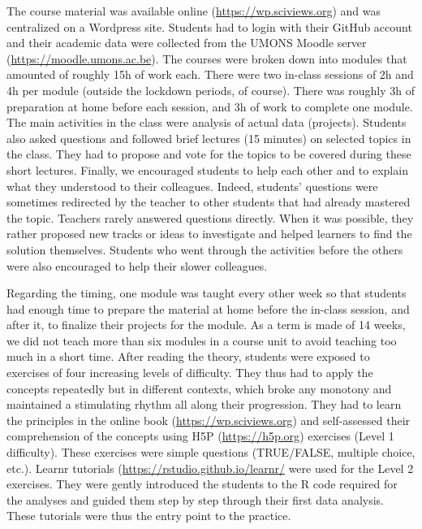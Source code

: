 \documentclass{aims} %
\theoremstyle{definition}
\begin{document}
The course material was available online (\url{https://wp.sciviews.org})
and was centralized on a Wordpress site. Students had to login with
their GitHub account and their academic data were collected from the
UMONS Moodle server (\url{https://moodle.umons.ac.be}). The courses were
broken down into modules that amounted of roughly 15h of work each.
There were two in-class sessions of 2h and 4h per module (outside the
lockdown periods, of course). There was roughly 3h of preparation at
home before each session, and 3h of work to complete one module. The
main activities in the class were analysis of actual data (projects).
Students also asked questions and followed brief lectures (15 minutes)
on selected topics in the class. They had to propose and vote for the
topics to be covered during these short lectures. Finally, we encouraged
students to help each other and to explain what they understood to their
colleagues. Indeed, students' questions were sometimes redirected by the
teacher to other students that had already mastered the topic. Teachers
rarely answered questions directly. When it was possible, they rather
proposed new tracks or ideas to investigate and helped learners to find
the solution themselves. Students who went through the activities before
the others were also encouraged to help their slower colleagues.

Regarding the timing, one module was taught every other week so that
students had enough time to prepare the material at home before the
in-class session, and after it, to finalize their projects for the
module. As a term is made of 14 weeks, we did not teach more than six
modules in a course unit to avoid teaching too much in a short time.
After reading the theory, students were exposed to exercises of four
increasing levels of difficulty. They thus had to apply the concepts
repeatedly but in different contexts, which broke any monotony and
maintained a stimulating rhythm all along their progression. They had to
learn the principles in the online book (\url{https://wp.sciviews.org})
and self-assessed their comprehension of the concepts using H5P
(\url{https://h5p.org}) exercises (Level 1 difficulty). These exercises
were simple questions (TRUE/FALSE, multiple choice, etc.). Learnr
tutorials (\url{https://rstudio.github.io/learnr/} were used for the
Level 2 exercises. They were gently introduced the students to the R
code required for the analyses and guided them step by step through
their first data analysis. These tutorials were thus the entry point to
the practice.
\end{document}
